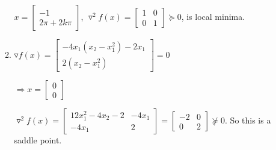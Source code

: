 \documentclass[12pt]{article}
\begin{document}
\begin{enumerate}
\begin{enumerate}
$ x = \begin{bmatrix} -1 \\ 2 \pi + 2k\pi \end{bmatrix}$, $\triangledown ^2 f(x) = \begin{bmatrix} 1 & 0 \\ 0 & 1 \end{bmatrix} \succeq 0$, is local minima.


\item
$\triangledown f(x) = \begin{bmatrix} -4 x_1 (x_2-x_1^2) - 2x_1 \\ 2(x_2-x_1^2) \end{bmatrix}=0 $

$\Longrightarrow x = \begin{bmatrix} 0 \\ 0 \end{bmatrix}$

$\triangledown ^2 f(x) = \begin{bmatrix} 12x_1^2 -4 x_2 -2 & -4x_1 \\ -4 x_1 & 2 \end{bmatrix} = \begin{bmatrix} -2 & 0 \\ 0 & 2 \end{bmatrix} \nsucceq 0$. So this is a saddle point.

\end{enumerate}




\end{enumerate}
\end{document}
